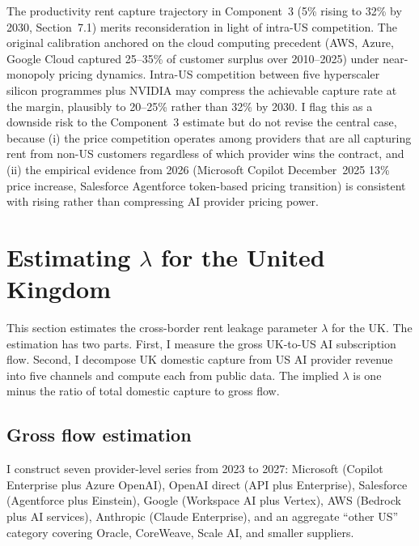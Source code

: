 \documentclass[11pt,letterpaper]{article}
\theoremstyle{remark}
\begin{document}
The productivity rent capture trajectory in Component~3 (5\% rising to 32\% by 2030, Section~7.1) merits reconsideration in light of intra-{US} competition. The original calibration anchored on the cloud computing precedent ({AWS}, Azure, Google Cloud captured 25--35\% of customer surplus over 2010--2025) under near-monopoly pricing dynamics. Intra-{US} competition between five hyperscaler silicon programmes plus NVIDIA may compress the achievable capture rate at the margin, plausibly to 20--25\% rather than 32\% by 2030. I flag this as a downside risk to the Component~3 estimate but do not revise the central case, because (i) the price competition operates among providers that are all capturing rent from non-{US} customers regardless of which provider wins the contract, and (ii) the empirical evidence from 2026 ({Microsoft Copilot} December~2025 13\% price increase, {Salesforce} Agentforce token-based pricing transition) is consistent with rising rather than compressing {AI} provider pricing power.

\section{Estimating $\lambda$ for the United Kingdom}

This section estimates the cross-border rent leakage parameter $\lambda$ for the {UK}. The estimation has two parts. First, I measure the gross {UK}-to-{US} {AI} subscription flow. Second, I decompose {UK} domestic capture from {US} {AI} provider revenue into five channels and compute each from public data. The implied $\lambda$ is one minus the ratio of total domestic capture to gross flow.

\subsection{Gross flow estimation}

I construct seven provider-level series from 2023 to 2027: Microsoft (Copilot Enterprise plus Azure OpenAI), OpenAI direct ({API} plus Enterprise), Salesforce (Agentforce plus Einstein), Google (Workspace {AI} plus Vertex), {AWS} (Bedrock plus {AI} services), Anthropic (Claude Enterprise), and an aggregate ``other {US}'' category covering Oracle, CoreWeave, Scale {AI}, and smaller suppliers.
\end{document}
